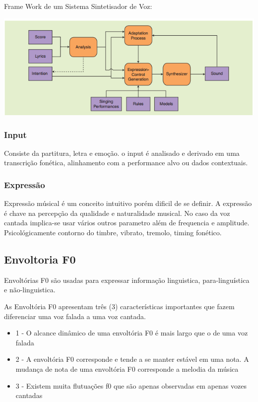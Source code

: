 		Frame Work de um Sistema Sintetisador de Voz:
		
		\includegraphics{frameWork.png}
		
		\subsubsection{Input}
		Consiste da partitura, letra e emoção.
		o input é analisado e derivado em uma transcrição fonética, alinhamento com a performance alvo ou dados contextuais.\cite{FrameWork}\linebreak
		
		\subsubsection{Expressão}
		Expressão músical é um conceito intuitivo porém dificil de se definir. A expressão é chave na percepção da qualidade e naturalidade musical.
		No caso da voz cantada implica-se usar vários outros parametro além de frequencia e amplitude. Psicológicamente contorno do timbre, vibrato, tremolo, timing fonético.\cite{FrameWork}\linebreak
	
	
	\subsection{Envoltoria F0}
	
	Envoltórias F0 são usadas para expressar informação linguistica, para-linguística e não-linguistica.\cite{SaitouF0}
	\linebreak
	
	As Envoltória F0 apresentam três (3) características importantes que fazem diferenciar uma voz falada a uma voz cantada.\cite{SaitouNada}
	\linebreak
	\begin{itemize}
		\item 1 - O alcance dinâmico de uma envoltória F0 é mais largo que o de uma voz falada
		\item 2 - A envoltória F0 corresponde e tende a se manter estável em uma nota. A mudança de nota de uma envoltória F0 corresponde a melodia da música
		\item 3 - Existem muita flutuações f0 que são apenas observadas em apenas vozes cantadas
	\end{itemize}
	
